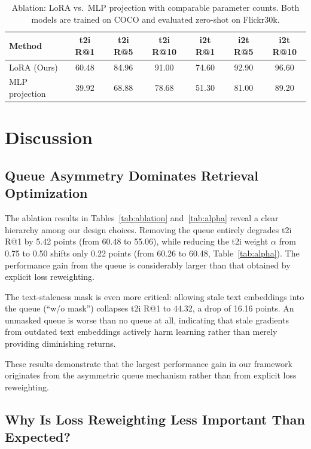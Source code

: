 \documentclass[10pt,leqno]{amsart}
\begin{document}
\begin{table}[h]
\centering
\caption{Ablation: LoRA vs.\ MLP projection with comparable parameter counts. Both models are trained on COCO and evaluated zero-shot on Flickr30k.}
\label{tab:ablation_mlp}
\begin{tabular}{lcccccc}
\toprule
Method & t2i R@1 & t2i R@5 & t2i R@10 & i2t R@1 & i2t R@5 & i2t R@10 \\
\midrule
LoRA (Ours) & 60.48 & 84.96 & 91.00 & 74.60 & 92.90 & 96.60 \\
MLP projection & 39.92 & 68.88 & 78.68 & 51.30 & 81.00 & 89.20 \\
\bottomrule
\end{tabular}
\end{table}

\section{Discussion}

\subsection{Queue Asymmetry Dominates Retrieval Optimization}

The ablation results in Tables~\ref{tab:ablation} and~\ref{tab:alpha} reveal a clear hierarchy among our design choices. Removing the queue entirely degrades t2i R@1 by 5.42 points (from 60.48 to 55.06), while reducing the t2i weight $\alpha$ from 0.75 to 0.50 shifts only 0.22 points (from 60.26 to 60.48, Table~\ref{tab:alpha}). The performance gain from the queue is considerably larger than that obtained by explicit loss reweighting.

The text-staleness mask is even more critical: allowing stale text embeddings into the queue (``w/o mask'') collapses t2i R@1 to 44.32, a drop of 16.16 points. An unmasked queue is worse than no queue at all, indicating that stale gradients from outdated text embeddings actively harm learning rather than merely providing diminishing returns.

These results demonstrate that the largest performance gain in our framework originates from the asymmetric queue mechanism rather than from explicit loss reweighting.

\subsection{Why Is Loss Reweighting Less Important Than Expected?}
\end{document}

